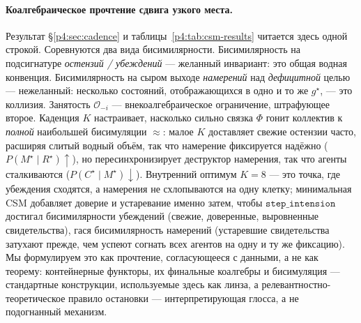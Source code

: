 \documentclass{article}
\newcommand{\method}[1]{\texttt{#1}}
\begin{document}
\paragraph{Коалгебраическое прочтение сдвига узкого места.}
Результат \S\ref{p4:sec:cadence} и таблицы~\ref{p4:tab:csm-results} читается
здесь одной строкой. Соревнуются два вида бисимилярности.
Бисимилярность на подсигнатуре \emph{остензий / убеждений} --- желанный
инвариант: это общая водная конвенция. Бисимилярность на сыром выходе
\emph{намерений} над \emph{дефицитной} целью --- нежеланный: несколько
состояний, отображающихся в одно и то же $g^{\star}$, --- это коллизия.
Занятость $\mathcal{O}_{-i}$ --- внекоалгебраическое ограничение,
штрафующее второе. Каденция $K$ настраивает, насколько сильно связка
$\Phi$ гонит коллектив к \emph{полной} наибольшей бисимуляции
$\approx$: малое $K$ доставляет свежие остензии часто, расширяя слитый
водный объём, так что намерение фиксируется надёжно
($P(M^\star\mid R^\star)\uparrow$), но пересинхронизирует деструктор
намерения, так что агенты сталкиваются
($P(C^\star\mid M^\star)\downarrow$). Внутренний оптимум $K{=}8$ ---
это точка, где убеждения сходятся, а намерения не схлопываются на одну
клетку; минимальная CSM добавляет доверие и устаревание именно затем,
чтобы $\method{step\_intension}$ достигал бисимилярности убеждений
(свежие, доверенные, выровненные свидетельства), гася бисимилярность
намерений (устаревшие свидетельства затухают прежде, чем успеют согнать
всех агентов на одну и ту же фиксацию). Мы формулируем это как
прочтение, согласующееся с данными, а не как теорему: контейнерные
функторы, их финальные коалгебры и бисимуляция --- стандартные
конструкции, используемые здесь как линза, а
релевантностно-теоретическое правило остановки --- интерпретирующая
глосса, а не подогнанный механизм.
\end{document}
